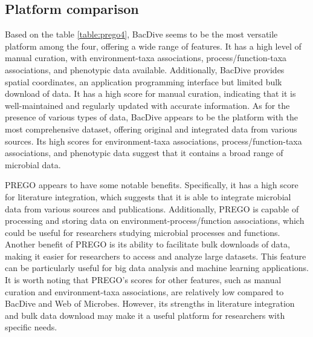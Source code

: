    \subsection{Platform comparison}
   \label{subsec:prego-similar-platforms}


Based on the table \ref{table:prego4}, BacDive seems to be the most versatile
platform among the four, offering a wide range of features. It has a high level
of manual curation, with environment-taxa associations, process/function-taxa
associations, and phenotypic data available. Additionally, BacDive provides
spatial coordinates, an application programming interface but limited bulk download of data.
It has a high score for manual curation, indicating that it is well-maintained and regularly updated with accurate information.
As for the presence of various types of data, BacDive appears to be the platform
with the most comprehensive dataset, offering original and integrated data from
various sources. Its high scores for environment-taxa associations,
process/function-taxa associations, and phenotypic data suggest that it contains a broad range of microbial data.

PREGO appears to have some notable benefits. Specifically, it has a high score
for literature integration, which suggests that it is able to integrate microbial
data from various sources and publications. Additionally, PREGO is capable of
processing and storing data on environment-process/function associations, which
could be useful for researchers studying microbial processes and functions.
Another benefit of PREGO is its ability to facilitate bulk downloads of data,
making it easier for researchers to access and analyze large datasets.
This feature can be particularly useful for big data analysis and machine learning applications.
It is worth noting that PREGO's scores for other features, such as manual
curation and environment-taxa associations, are relatively low compared to
BacDive and Web of Microbes. However, its strengths in literature integration
and bulk data download may make it a useful platform for researchers with specific needs.


